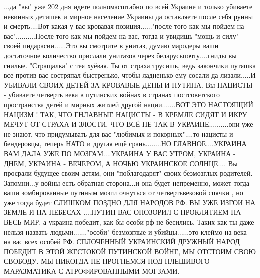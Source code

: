 ...да "вы" уже 202 дня идете полномасштабно по всей Украине и только убиваете
невинных детишек и мирное население Украины да оставляете после себя руины и
смерть....Вот какая у вас кровавая позиция......"после того как мы пойдем на
вас"..........После того как мы пойдем на вас, тогда и увидишь "мощь и силу"
своей пидарасии......Это вы смотрите в унитаз, думаю мародеры ваши достаточное
количество прислали унитазов через беларусьпочту....гниды вы гнилые.
"Стращалка" с тея хуёвая. Ты от страха трусишь, ведь закончики путяшка все
против вас состряпал быстренько, чтобы ладненько ему сосали да лизали.....И
УБИВАЛИ СВОИХ ДЕТЕЙ ЗА КРОВАВЫЕ ДЕНЬГИ ПУТИНА. Вы НАЦИСТЫ - убиваете четверть
века в путинских войнах в странах постсоветского пространства детей и мирных
житлей другой нации.......ВОТ ЭТО НАСТОЯЩИЙ НАЦИЗМ ! ТАК, ЧТО ГНЛАВНЫЕ НАЦИСТЫ
- В КРЕМЛЕ СИДЯТ И ИКРУ МЕЧУТ ОТ СТРАХА И ЗЛОСТИ, ЧТО ВСЁ НЕ ТАК В
УКРАИНЕ..........они уже не знают, что придумывать для вас "любимых и
покорных"....то нацисты и бендеровцы, теперь НАТО и другая ещё срань........НО
ГЛАВНОЕ....УКРАИНА ВАМ ДАЛА УЖЕ ПО МОЗГАМ....УКРАИНА У ВАС УТРОМ, УКРАИНА -
ДНЕМ, УКРАИНА - ВЕЧЕРОМ, А НОЧЬЮ УКРАИНСКОЕ СОЛНЦЕ.... Вы просрали будущее
своим детям, они "поблагодарят" своих безмозглых родителей. Запомни...у войны
есть обратная сторона...и она будет непременно, может тогда ваши зомбированные
путиным мозги очнуться от четвертьвековой спячки , но уже тогда будет СЛИШКОМ
ПОЗДНО ДЛЯ НАРОДОВ РФ. ВЫ УЖЕ ИЗГОИ НА ЗЕМЛЕ И НА НЕБЕСАХ ....ПУТИН ВАС
ОПОЗОРИЛ С ПРОКЛЯТИЕМ НА ВЕСЬ МИР. а украина победит, как бы особи рф не
бесились. Таких как ты даже нельзя назвать людьми......."особи" безмозглые и
убийцы......это клеймо на века на вас всех особей РФ. СПЛОЧЕННЫЙ УКРАИНСКИЙ
ДРУЖНЫЙ НАРОД ПОБЕДИТ В ЭТОЙ ЖЕСТОКОЙ ПУТИНСКОЙ ВОЙНЕ, МЫ ОТСТОИМ СВОЮ СВОБОДУ.
МЫ НИКОГДА НЕ ПРОГНЕМСЯ ПОД ПЛЕШИВОГО МАРАЗМАТИКА С АТРОФИРОВАННЫМИ МОГЗАМИ.

